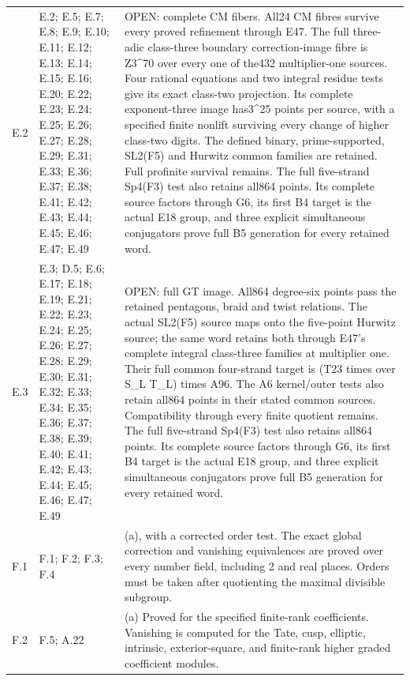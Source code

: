\begin{longtable}{@{}p{1.1cm}p{3.0cm}p{10.3cm}@{}}
E.2 & E.2; E.5; E.7; E.8; E.9; E.10; E.11; E.12; E.13; E.14; E.15; E.16; E.20; E.22; E.23; E.24; E.25; E.26; E.27; E.28; E.29; E.31; E.33; E.36; E.37; E.38; E.41; E.42; E.43; E.44; E.45; E.46; E.47; E.49 & OPEN: complete CM fibers. All24 CM fibres survive every proved refinement through E47. The full three-adic class-three boundary correction-image fibre is Z3\textasciicircum{}70 over every one of the432 multiplier-one sources. Four rational equations and two integral residue tests give its exact class-two projection. Its complete exponent-three image has3\textasciicircum{}25 points per source, with a specified finite nonlift surviving every change of higher class-two digits. The defined binary, prime-supported, SL2(F5) and Hurwitz common families are retained. Full profinite survival remains. The full five-strand Sp4(F3) test also retains all864 points. Its complete source factors through G6, its first B4 target is the actual E18 group, and three explicit simultaneous conjugators prove full B5 generation for every retained word. \\
E.3 & E.3; D.5; E.6; E.17; E.18; E.19; E.21; E.22; E.23; E.24; E.25; E.26; E.27; E.28; E.29; E.30; E.31; E.32; E.33; E.34; E.35; E.36; E.37; E.38; E.39; E.40; E.41; E.42; E.43; E.44; E.45; E.46; E.47; E.49 & OPEN: full GT image. All864 degree-six points pass the retained pentagons, braid and twist relations. The actual SL2(F5) source maps onto the five-point Hurwitz source; the same word retains both through E47's complete integral class-three families at multiplier one. Their full common four-strand target is (T23 times over S\_L T\_L) times A96. The A6 kernel/outer tests also retain all864 points in their stated common sources. Compatibility through every finite quotient remains. The full five-strand Sp4(F3) test also retains all864 points. Its complete source factors through G6, its first B4 target is the actual E18 group, and three explicit simultaneous conjugators prove full B5 generation for every retained word. \\
F.1 & F.1; F.2; F.3; F.4 & (a), with a corrected order test. The exact global correction and vanishing equivalences are proved over every number field, including 2 and real places. Orders must be taken after quotienting the maximal divisible subgroup. \\
F.2 & F.5; A.22 & (a) Proved for the specified finite-rank coefficients. Vanishing is computed for the Tate, cusp, elliptic, intrinsic, exterior-square, and finite-rank higher graded coefficient modules. \\

\end{longtable}
